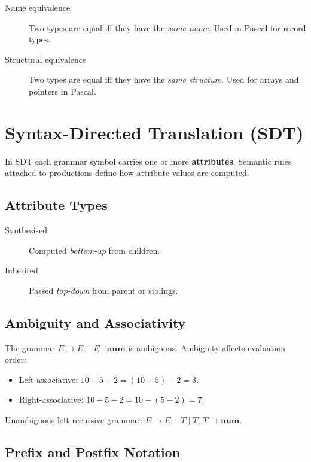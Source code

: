 \documentclass[12pt,a4paper]{article}
\begin{document}
\begin{description}
  \item[Name equivalence] Two types are equal iff they have the \emph{same name}.
        Used in Pascal for record types.
  \item[Structural equivalence] Two types are equal iff they have the \emph{same structure}.
        Used for arrays and pointers in Pascal.
\end{description}

\section{Syntax-Directed Translation (SDT)}

In SDT each grammar symbol carries one or more \textbf{attributes}.
Semantic rules attached to productions define how attribute values are computed.

\subsection{Attribute Types}

\begin{description}
  \item[Synthesised] Computed \emph{bottom-up} from children.
  \item[Inherited] Passed \emph{top-down} from parent or siblings.
\end{description}

\subsection{Ambiguity and Associativity}

The grammar $E \to E - E \mid \mathbf{num}$ is ambiguous.
Ambiguity affects evaluation order:
\begin{itemize}
  \item Left-associative: $10 - 5 - 2 = (10-5)-2 = 3$.
  \item Right-associative: $10 - 5 - 2 = 10-(5-2) = 7$.
\end{itemize}

Unambiguous left-recursive grammar: $E \to E - T \mid T$, \;$T \to \mathbf{num}$.

\subsection{Prefix and Postfix Notation}
\end{document}
